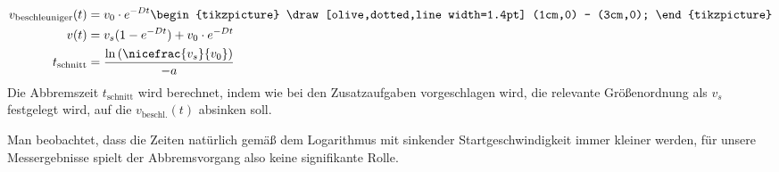 \begin{align*}
    v_\mathrm{beschleuniger}(t)&=v_0\cdot e^{-Dt}\begin{tikzpicture}
        \draw[olive,dotted,line width=1.4pt] (1cm,0) -- (3cm,0);
    \end{tikzpicture}\\
    v(t)&=v_s(1-e^{-Dt})+v_0\cdot e^{-Dt}\\
    t_\mathrm{schnitt}&=\frac{\ln{(\nicefrac{v_s}{v_0})}}{-a}
\end{align*}
Die Abbremszeit \(t_\mathrm{schnitt}\) wird berechnet, indem wie bei den Zusatzaufgaben\autocite{Dimitrij} vorgeschlagen wird, die relevante Größenordnung als \(v_s\) festgelegt wird, auf die \(v_\mathrm{beschl.}(t)\) absinken soll. 

Man beobachtet, dass die Zeiten natürlich gemäß dem Logarithmus mit sinkender Startgeschwindigkeit immer kleiner werden, für unsere Messergebnisse spielt der Abbremsvorgang also keine signifikante Rolle. \\
\newpage
{}
